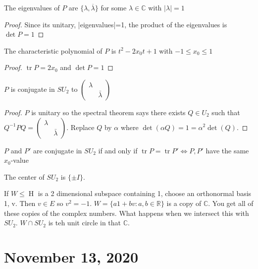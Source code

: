 \documentclass{article}
\newcommand{\C}{\mathbb{C}}
\newcommand{\R}{\mathbb{R}}
\newcommand{\HH}{{\operatorname{H}}}
\DeclareMathOperator{\tr}{tr}
\begin{document}
\begin{fact}
The eigenvalues of $P$ are $\{\lambda,\overline{\lambda}\}$ for some $\lambda\in\C$ with $|\lambda|=1$
\end{fact}
\begin{proof}
Since its unitary, |eigenvalues|=1, the product of the eigenvalues is $\det P=1$ 
\end{proof}
\begin{fact}
The characteristic polynomial of $P$ is $t^2-2x_0t+1$ with $-1\leq x_0\leq 1$
\end{fact}
\begin{proof}
$\tr P=2x_0$ and $\det P=1$
\end{proof}
\begin{fact}
$P$ is conjugate in $SU_2$ to $\begin{pmatrix}
\lambda&\\&\bar{\lambda}
\end{pmatrix}$
\end{fact}
\begin{proof}
$P$ is unitary so the spectral theorem says there exists $Q\in U_2$ such that $Q^{-1}PQ=\begin{pmatrix}
\lambda&\\&\bar{\lambda}
\end{pmatrix}$. Replace $Q$ by $\alpha$ where $\det(\alpha Q)=1=\alpha^2\det(Q)$.
\end{proof}
\begin{fact}
$P$ and $P'$ are conjugate in $SU_2$ if and only if $\tr P=\tr P'\iff P,P' $ have the same $x_0$-value 
\end{fact}
The center of $SU_2$ is $\{\pm I\}$.

If $W\leq \HH$ is a 2 dimensional subspace containing 1,  choose an orthonormal basis 1, v. Then $v\in E$ so $v^2=-1$. $W=\{a1+bv:a,b\in\R\}$ is a copy of $\C$. You get all of these copies of the complex numbers. What happens when we intersect this with $SU_2$. $W\cap SU_2$ is teh unit circle in that $\C$.

\section{November 13, 2020}
\end{document}
